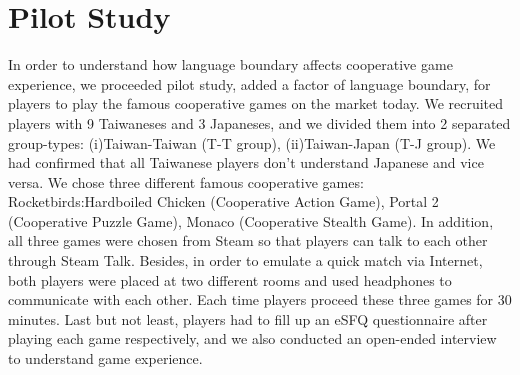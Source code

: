 \section{Pilot Study}


In order to understand how language boundary affects cooperative game experience, we proceeded pilot study, added a factor of language boundary, for players to play the famous cooperative games on the market today. We recruited players with 9 Taiwaneses and 3 Japaneses, and we divided them into 2 separated group-types: (i)Taiwan-Taiwan (T-T group), (ii)Taiwan-Japan (T-J group). We had confirmed that all Taiwanese players don't understand Japanese and vice versa. We chose three different famous cooperative games: Rocketbirds:Hardboiled Chicken (Cooperative Action Game), Portal 2 (Cooperative Puzzle Game), Monaco (Cooperative Stealth Game). In addition, all three games were chosen from Steam\cite{PS1} so that players can talk to each other through Steam Talk. Besides, in order to emulate a quick match via Internet, both players were placed at two different rooms and used headphones to communicate with each other. Each time players proceed these three games for 30 minutes. Last but not least, players had to fill up an eSFQ\cite{eSFQ} questionnaire after playing each game respectively, and we also conducted an open-ended interview to understand game experience. 


